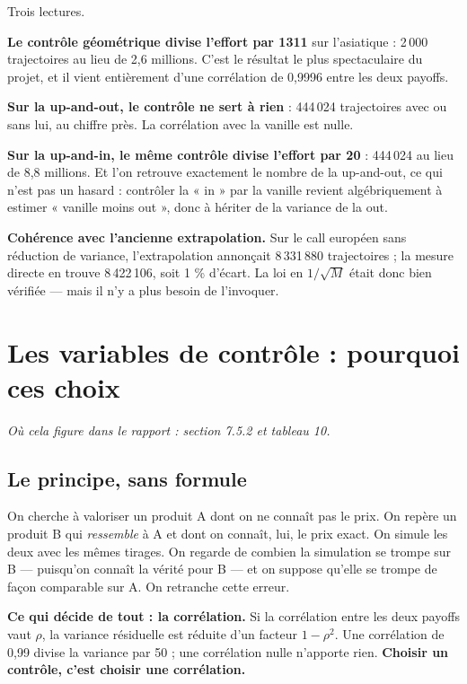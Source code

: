\documentclass[11pt,a4paper]{article}
\newcommand{\ou}[1]{\textit{\small Où cela figure dans le rapport : #1}}
\begin{document}
Trois lectures.

\textbf{Le contrôle géométrique divise l'effort par 1311} sur l'asiatique :
2\,000 trajectoires au lieu de 2,6 millions. C'est le résultat le plus
spectaculaire du projet, et il vient entièrement d'une corrélation de 0,9996
entre les deux payoffs.

\textbf{Sur la up-and-out, le contrôle ne sert à rien} : 444\,024 trajectoires
avec ou sans lui, au chiffre près. La corrélation avec la vanille est nulle.

\textbf{Sur la up-and-in, le même contrôle divise l'effort par 20} : 444\,024
au lieu de 8,8 millions. Et l'on retrouve exactement le nombre de la up-and-out,
ce qui n'est pas un hasard : contrôler la « in » par la vanille revient
algébriquement à estimer « vanille moins out », donc à hériter de la variance
de la out.

\begin{encadre}
\textbf{Cohérence avec l'ancienne extrapolation.} Sur le call européen sans
réduction de variance, l'extrapolation annonçait 8\,331\,880 trajectoires ; la
mesure directe en trouve 8\,422\,106, soit 1 \% d'écart. La loi en $1/\sqrt{M}$
était donc bien vérifiée --- mais il n'y a plus besoin de l'invoquer.
\end{encadre}

\section{Les variables de contrôle : pourquoi ces choix}

\ou{section 7.5.2 et tableau 10.}

\subsection{Le principe, sans formule}

On cherche à valoriser un produit A dont on ne connaît pas le prix. On repère
un produit B qui \emph{ressemble} à A et dont on connaît, lui, le prix exact.
On simule les deux avec les mêmes tirages. On regarde de combien la simulation
se trompe sur B --- puisqu'on connaît la vérité pour B --- et on suppose qu'elle
se trompe de façon comparable sur A. On retranche cette erreur.

\begin{encadre}
\textbf{Ce qui décide de tout : la corrélation.} Si la corrélation entre les
deux payoffs vaut $\rho$, la variance résiduelle est réduite d'un facteur
$1-\rho^2$. Une corrélation de 0,99 divise la variance par 50 ; une corrélation
nulle n'apporte rien. \textbf{Choisir un contrôle, c'est choisir une
corrélation.}
\end{encadre}
\end{document}
